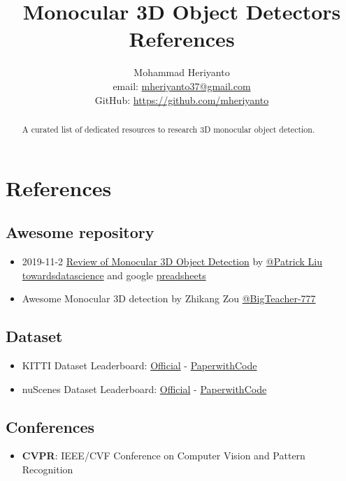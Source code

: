 \documentclass[12pt,oneside,a4paper]{article}
\begin{document}
\title{Monocular 3D Object Detectors References}
\author{Mohammad Heriyanto \\ email: \href{mailto:mheriyanto37@gmail.com}{mheriyanto37@gmail.com} \\ GitHub: \href{https://github.com/mheriyanto/Data-Science-and-Machine-Learning-References}{https://github.com/mheriyanto}}
   
\maketitle

\begin{abstract}
    A curated list of dedicated resources to research 3D monocular object detection. 
\end{abstract}

\section{References}
\subsection{Awesome repository}
\begin{itemize}
\item 2019-11-2 \href{https://github.com/patrick-llgc/Learning-Deep-Learning/blob/master/paper_notes/review_mono_3dod.md}{Review of Monocular 3D Object Detection} by \href{https://github.com/patrick-llgc}{@Patrick Liu} \href{https://towardsdatascience.com/monocular-3d-object-detection-in-autonomous-driving-2476a3c7f57e?source=friends_link&sk=160d236be1881b6ee1b431a943666fdb}{towardsdatascience} and google \href{https://docs.google.com/spreadsheets/d/1X_ViM-W4QbHPbJ2dHouRgkRAyzEnBS6J_9VxPEXvDM4/edit#gid=0}{preadsheets}
\item Awesome Monocular 3D detection by Zhikang Zou \href{https://github.com/BigTeacher-777/Awesome-Monocular-3D-detection}{@BigTeacher-777}
\end{itemize}

\subsection{Dataset}
\begin{itemize}
\item KITTI Dataset Leaderboard: \href{http://www.cvlibs.net/datasets/kitti/eval_object.php?obj_benchmark=3d}{Official} - \href{https://paperswithcode.com/sota/3d-object-detection-on-kitti-cars-moderate}{PaperwithCode}
\item nuScenes Dataset Leaderboard: \href{https://www.nuscenes.org/object-detection?externalData=all&mapData=all&modalities=Camera}{Official} - \href{https://paperswithcode.com/sota/3d-object-detection-on-nuscenes}{PaperwithCode}
\end{itemize}

\subsection{Conferences}
\begin{itemize}
\item {\bf CVPR}: IEEE/CVF Conference on Computer Vision and Pattern Recognition
\end{itemize}
\end{document}
